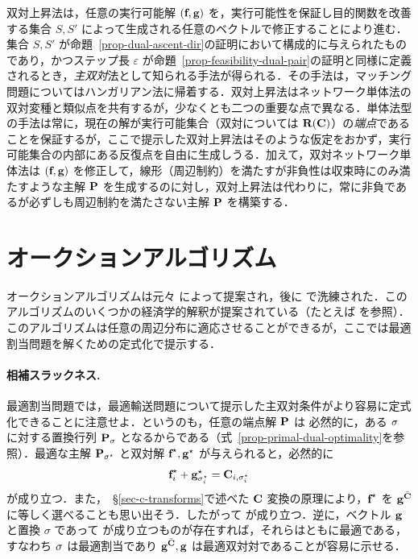 双対上昇法は，任意の実行可能解 $(\fD,\gD)$ を，実行可能性を保証し目的関数を改善する集合 $S,S'$ によって生成される任意のベクトルで修正することにより進む．集合 $S,S'$ が命題~\ref{prop-dual-ascent-dir}の証明において構成的に与えられたものであり，かつステップ長 $\varepsilon$ が命題~\ref{prop-feasibility-dual-pair}の証明と同様に定義されるとき，\emph{主双対}法として知られる手法が得られる．その手法は，マッチング問題についてはハンガリアン法に帰着する．双対上昇法はネットワーク単体法の双対変種と類似点を共有するが，少なくとも二つの重要な点で異なる．単体法型の手法は常に，現在の解が実行可能集合（双対については $\PotentialsD(\C)$）の\emph{端点}であることを保証するが，ここで提示した双対上昇法はそのような仮定をおかず，実行可能集合の内部にある反復点を自由に生成しうる．加えて，双対ネットワーク単体法は $(\fD,\gD)$ を修正して，線形（周辺制約）を満たすが非負性は収束時にのみ満たすような主解 $\P$ を生成するのに対し，双対上昇法は代わりに，常に非負であるが必ずしも周辺制約を満たさない主解 $\P$ を構築する．

\section{オークションアルゴリズム}\label{s-auction}
オークションアルゴリズムは元々 \citet{bertsekas1981new} によって提案され，後に \citep{bertsekas1988dual} で洗練された．このアルゴリズムのいくつかの経済学的解釈が提案されている（たとえば \citet{bertsekas1992auction} を参照）．このアルゴリズムは任意の周辺分布に適応させることができるが，ここでは最適割当問題を解くための定式化で提示する．

\paragraph{相補スラックネス.} 最適割当問題では，最適輸送問題について提示した主双対条件がより容易に定式化できることに注意せよ．というのも，任意の端点解 $\P$ は  必然的に，ある $\si$ に対する置換行列 $\P_\si$ となるからである（式~\eqref{prop-primal-dual-optimality}を参照）．最適な主解 $\P_{\si^\star}$ と双対解 $\fD^\star,\gD^\star$ が与えられると，必然的に
$$
\fD^\star_i + \gD^\star_{\si^\star_i} = \C_{i,{\si_i^\star}}
$$
が成り立つ．また，~\S\ref{sec-c-transforms}で述べた $\C$ 変換の原理により，$\fD^\star$ を $\gD^{\bar\C}$ に等しく選べることも思い出そう．したがって
が成り立つ．逆に，ベクトル $\gD$ と置換 $\sigma$ であって
が成り立つものが存在すれば，それらはともに最適である，すなわち $\si$ は最適割当であり $\gD^{\bar\C},\gD$ は最適双対対であることが容易に示せる．


